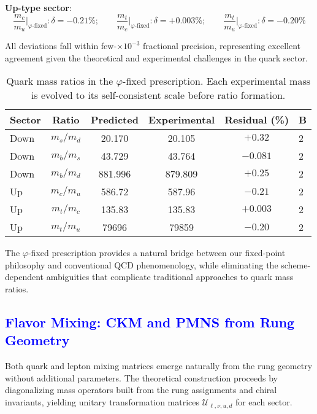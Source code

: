\documentclass[%
amsmath,amssymb,
aps,
prb,
floatfix, showkeys, 10pt,
]{revtex4-2}
\newcommand{\modif}[1]{\textcolor{blue}{#1}}
\begin{document}
\textbf{Up-type sector}:
\begin{equation}
\frac{m_c}{m_u}\Big|_{\varphi\text{-fixed}} : \delta = -0.21\% ;  \quad  \quad
\frac{m_t}{m_c}\Big|_{\varphi\text{-fixed}} : \delta = +0.003\% ; \quad  \quad
\frac{m_t}{m_u}\Big|_{\varphi\text{-fixed}} : \delta = -0.20\% 
\end{equation}

All deviations fall within few-$\times 10^{-3}$ fractional precision, representing excellent agreement given the theoretical and experimental challenges in the quark sector.
\begin{table}[ht]
\centering
\caption{Quark mass ratios in the $\varphi$-fixed prescription. Each experimental mass is evolved to its self-consistent scale before ratio formation.}
\label{tab:quarks}
\begin{tabular}{lccccl}
\hline\hline
Sector & Ratio & Predicted & Experimental & Residual (\%) & B \\
\hline
Down & $m_s/m_d$ & 20.170 & 20.105 & $+0.32$      &  2  \\
Down & $m_b/m_s$ & 43.729 & 43.764 & $-0.081$     &  2  \\
Down & $m_b/m_d$ & 881.996 & 879.809 & $+0.25$    &  2   \\
\hline
Up & $m_c/m_u$ & 586.72 & 587.96 & $-0.21$       &  2  \\
Up & $m_t/m_c$ & 135.83 & 135.83 & $+0.003$      &  2  \\
Up & $m_t/m_u$ & 79696 & 79859 & $-0.20$         &  2  \\
\hline\hline
\end{tabular}
\end{table}

The $\varphi$-fixed prescription provides a natural bridge between our fixed-point philosophy and conventional QCD phenomenology, while eliminating the scheme-dependent ambiguities that complicate traditional approaches to quark mass ratios.











{\modif{ \subsection{Flavor Mixing: CKM and PMNS from Rung Geometry}
\label{subsec:mixing_results}  }}
Both quark and lepton mixing matrices emerge naturally from the rung geometry without additional parameters. The theoretical construction proceeds by diagonalizing mass operators built from the rung assignments and chiral invariants, yielding unitary transformation matrices $\mathcal{U}_{\ell,\nu,u,d}$ for each sector.
\end{document}
